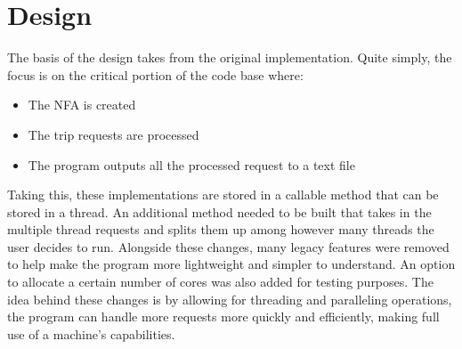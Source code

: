 \documentclass[English]{article}
\theoremstyle{remark}
\numberwithin{equation}{section}
\begin{document}
\section{Design}
\label{sec:design}
The basis of the design takes from the original implementation. Quite simply, the focus is on the critical portion of the code base where:
\begin{itemize}
    \item The NFA is created
    \item The trip requests are processed
    \item The program outputs all the processed request to a text file
\end{itemize}
Taking this, these implementations are stored in a callable method that can be stored in a thread. An additional method needed to be built that takes in the multiple thread requests and splits them up among however many threads the user decides to run. Alongside these changes, many legacy features were removed to help make the program more lightweight and simpler to understand. An option to allocate a certain number of cores was also added for testing purposes.
The idea behind these changes is by allowing for threading and paralleling operations, the program can handle more requests more quickly and efficiently, making full use of a machine's capabilities. 
\end{document}
